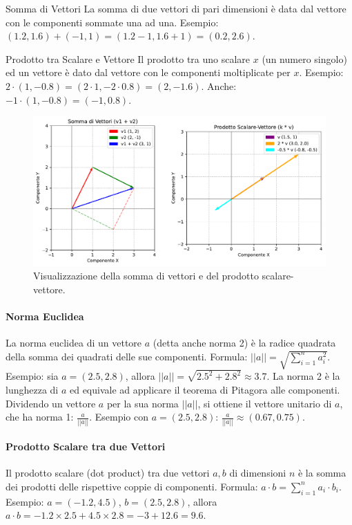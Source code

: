 \documentclass{article}
\begin{document}
\begin{definitionbox}{Somma di Vettori}
    La somma di due vettori di pari dimensioni è data dal vettore con le componenti sommate una ad una.
    Esempio: $(1.2, 1.6) + (-1, 1) = (1.2-1, 1.6+1) = (0.2, 2.6)$.
\end{definitionbox}

\begin{definitionbox}{Prodotto tra Scalare e Vettore}
    Il prodotto tra uno scalare $x$ (un numero singolo) ed un vettore è dato dal vettore con le componenti moltiplicate per $x$.
    Esempio: $2 \cdot (1, -0.8) = (2 \cdot 1, -2 \cdot 0.8) = (2, -1.6)$.
    Anche: $-1 \cdot (1, -0.8) = (-1, 0.8)$.
\end{definitionbox}

\begin{figure}[H]
    \centering
    \includegraphics[width=1\textwidth]{images/vector_operations_example.pdf}
    \caption{Visualizzazione della somma di vettori e del prodotto scalare-vettore.}
    \label{fig:vector_ops_example}
\end{figure}


\paragraph{Norma Euclidea} La norma euclidea di un vettore $a$ (detta anche norma 2) è la radice quadrata della somma dei quadrati delle sue componenti.
Formula: $||a|| = \sqrt{\sum_{i=1}^{n} a_i^2}$.
Esempio: sia $a = (2.5, 2.8)$, allora $||a|| = \sqrt{2.5^2 + 2.8^2} \approx 3.7$.
La norma 2 è la lunghezza di $a$ ed equivale ad applicare il teorema di Pitagora alle componenti.
Dividendo un vettore $a$ per la sua norma $||a||$, si ottiene il vettore unitario di $a$, che ha norma 1: $\frac{a}{||a||}$. Esempio con $a=(2.5, 2.8)$: $\frac{a}{||a||} \approx (0.67, 0.75)$.

\paragraph{Prodotto Scalare tra due Vettori} Il prodotto scalare (dot product) tra due vettori $a, b$ di dimensioni $n$ è la somma dei prodotti delle rispettive coppie di componenti.
Formula: $a \cdot b = \sum_{i=1}^{n} a_i \cdot b_i$.
Esempio: $a = (-1.2, 4.5)$, $b = (2.5, 2.8)$, allora $a \cdot b = -1.2 \times 2.5 + 4.5 \times 2.8 = -3 + 12.6 = 9.6$.
\end{document}
